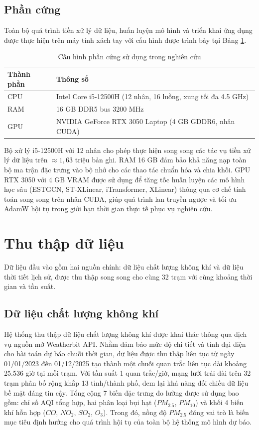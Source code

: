 \subsection{Phần cứng}

Toàn bộ quá trình tiền xử lý dữ liệu, huấn luyện mô hình và triển khai ứng dụng được thực hiện trên máy tính xách tay với cấu hình được trình bày tại Bảng \ref{tab:phan_cung}.

\begin{table}[H]
    \centering
    \caption{Cấu hình phần cứng sử dụng trong nghiên cứu}
    \label{tab:phan_cung}
    \renewcommand{\arraystretch}{1.3}
    \begin{tabular}{p{3cm} p{11.3cm}}
    \toprule
    \textbf{Thành phần} & \textbf{Thông số} \\
    \midrule
    CPU & Intel Core i5-12500H (12 nhân, 16 luồng, xung tối đa 4.5 GHz) \\
    RAM & 16 GB DDR5 bus 3200 MHz \\
    GPU & NVIDIA GeForce RTX 3050 Laptop (4 GB GDDR6, nhân CUDA) \\
    \bottomrule
    \end{tabular}
\end{table}

Bộ xử lý i5-12500H với 12 nhân cho phép thực hiện song song các tác vụ tiền xử lý dữ liệu trên $\approx 1{,}63$ triệu bản ghi. RAM 16 GB đảm bảo khả năng nạp toàn bộ ma trận đặc trưng vào bộ nhớ cho các thao tác chuẩn hóa và chia khối. GPU RTX 3050 với 4 GB VRAM được sử dụng để tăng tốc huấn luyện các mô hình học sâu (ESTGCN, ST-XLinear, iTransformer, XLinear) thông qua cơ chế tính toán song song trên nhân CUDA, giúp quá trình lan truyền ngược và tối ưu AdamW hội tụ trong giới hạn thời gian thực tế phục vụ nghiên cứu.
\section{Thu thập dữ liệu}

Dữ liệu đầu vào gồm hai nguồn chính: dữ liệu chất lượng không khí và dữ liệu thời tiết lịch sử, được thu thập song song cho cùng 32 trạm với cùng khoảng thời gian và tần suất.

\subsection{Dữ liệu chất lượng không khí}
Hệ thống thu thập dữ liệu chất lượng không khí được khai thác thông qua dịch vụ nguồn mở Weatherbit API. Nhằm đảm bảo mức độ chi tiết và tính đại diện cho bài toán dự báo chuỗi thời gian, dữ liệu được thu thập liên tục từ ngày 01/01/2023 đến 01/12/2025 tạo thành một chuỗi quan trắc liên tục dài khoảng 25.536 giờ tại mỗi trạm. Với tần suất 1 quan trắc/giờ, mạng lưới trải dài trên 32 trạm phân bố rộng khắp 13 tỉnh/thành phố, đem lại khả năng đối chiếu dữ liệu bề mặt đáng tin cậy. Tổng cộng 7 biến đặc trưng đo lường được sử dụng bao gồm: chỉ số AQI tổng hợp, hai phân loại bụi hạt ($PM_{2.5}$, $PM_{10}$) và khối 4 biến khí hỗn hợp ($CO$, $NO_2$, $SO_2$, $O_3$). Trong đó, nồng độ $PM_{2.5}$ đóng vai trò là biến mục tiêu định hướng cho quá trình hội tụ của toàn bộ hệ thống mô hình dự báo.

